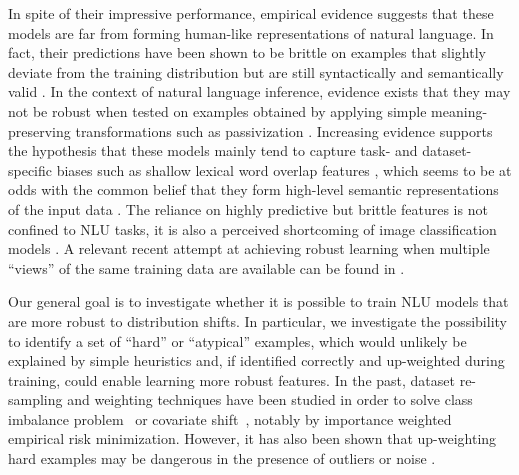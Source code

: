 In spite of their impressive performance, empirical evidence suggests that these models are far from forming human-like representations of natural language. In fact, their predictions have been shown to be brittle on examples that slightly deviate from the training distribution but are still syntactically and semantically valid \cite{jia2017adversarial,linzen2019right}. In the context of natural language inference, evidence exists that they may not be robust when tested on examples obtained by applying simple meaning-preserving transformations such as passivization \cite{dasgupta2018evaluating}.
Increasing evidence supports the hypothesis that these models mainly tend to capture task- and dataset-specific biases such as shallow lexical word overlap features \cite{poliak2018hypothesis,dasgupta2018evaluating,linzen2019right,clark2019dont,zhang-etal-2019-paws}, which seems to be at odds with the common belief that they form high-level semantic representations of the input data \cite{bengio2009learning}. The reliance on highly predictive but brittle features is not confined to NLU tasks, it is also a perceived shortcoming of image classification models \cite{brendel2019approximating,geirhos2018imagenet,jacobsen2018excessive}. A relevant recent attempt at achieving robust learning when multiple ``views'' of the same training data are available can be found in .

Our general goal is to investigate whether it is possible to train NLU models that are more robust to distribution shifts. In particular, we investigate the possibility to identify a set of ``hard'' or ``atypical'' examples, which would unlikely be explained by simple heuristics and, if identified correctly and up-weighted during training, could enable learning more robust features. In the past, dataset re-sampling and weighting techniques have been studied in order to solve class imbalance problem~\cite{chawla2002smote} or covariate shift~\cite{sugiyama2007covariate}, notably by importance weighted empirical risk minimization. However, it has also been shown that up-weighting hard examples may be dangerous in the presence of outliers or noise \cite{chapelle2007training,Kumar10,toneva2018empirical}.

